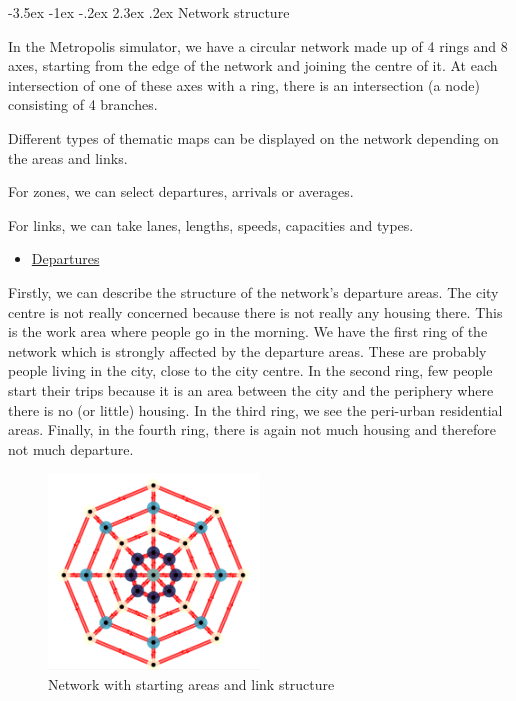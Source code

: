 \documentclass[a4paper, 12pt,oneside]{article}
\makeatletter
\renewcommand{\subsection}{\@startsection {subsection}{1}{\z@}%
             {-3.5ex \@plus -1ex \@minus -.2ex}%
             {2.3ex \@plus.2ex}%
             {\normalfont\normalsize\bfseries}}
\makeatother
\begin{document}
\subsection{Network structure}

In the Metropolis simulator, we have a circular network made up of 4 rings and 8 axes, starting from the edge of the network and joining the centre of it. At each intersection of one of these axes with a ring, there is an intersection (a node) consisting of 4 branches.

Different types of thematic maps can be displayed on the network depending on the areas and links.

For zones, we can select departures, arrivals or averages.

For links, we can take lanes, lengths, speeds, capacities and types.

\begin{itemize}
    \item \underline{Departures}
\end{itemize}

Firstly, we can describe the structure of the network's departure areas.
The city centre is not really concerned because there is not really any housing there. This is the work area where people go in the morning.
We have the first ring of the network which is strongly affected by the departure areas. These are probably people living in the city, close to the city centre.
In the second ring, few people start their trips because it is an area between the city and the periphery where there is no (or little) housing.
In the third ring, we see the peri-urban residential areas.
Finally, in the fourth ring, there is again not much housing and therefore not much departure.

\begin{figure}[H]
    \centering
    \includegraphics[width=0.5\textwidth]{Images/capture departure link.png}
    \caption{Network with starting areas and link structure}
\end{figure}
\end{document}
